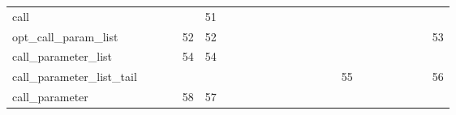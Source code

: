 \begin{table}[htbp]
\begin{tabular}{l|ccccccccccccccccccccccc}
call                        &                   &          &          &      & 51 &       &       &         &      &          &        &      &     &                    &      &     &     &       &          &          &     &       &         \\
opt\_call\_param\_list      &                   &          &          & 52   & 52 &       &       &         &      &          &        &      &     &                    &      &     &     &       &          &          &     &       & 53      \\
call\_parameter\_list       &                   &          &          & 54   & 54 &       &       &         &      &          &        &      &     &                    &      &     &     &       &          &          &     &       &         \\
call\_parameter\_list\_tail &                   &          &          &      &    &       &       &         &      &          &        &      &     &                    &      & 55  &     &       &          &          &     &       & 56      \\
call\_parameter             &                   &          &          & 58   & 57 &       &       &         &      &          &        &      &     &                    &      &     &     &       &          &          &     &       &        \\
\bottomrule
\end{tabular}
\end{table}
